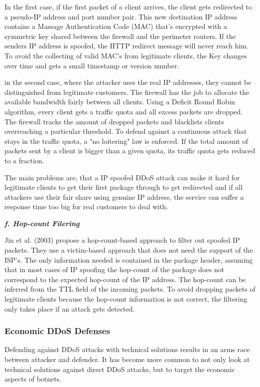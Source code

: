 In the first case, if the first packet of a client arrives, the client gets redirected to a pseudo-IP address and port number pair.
This new destination IP address contains a Massage Authentication Code (MAC) that's encrypted with a symmetric key shared between the firewall and the perimeter routers.
If the senders IP address is spoofed, the HTTP redirect message will never reach him.
To avoid the collecting of valid MAC's from legitimate clients, the Key changes over time and gets a small timestamp or version number.\cite{Xu03}

in the second case, where the attacker uses the real IP addresses, they cannot be distinguished from legitimate customers.
The firewall has the job to allocate the available bandwidth fairly between all clients.
Using a Deficit Round Robin algorithm, every client gets a traffic quota and all excess packets are dropped.
The firewall tracks the amount of dropped packets and blacklists clients overreaching a particular threshold.
To defend against a continuous attack that stays in the traffic quota, a "no loitering" law is enforced.
If the total amount of packets sent by a client is bigger than a given quota, its traffic quota gets reduced to a fraction.\cite{Xu03}

The main problems are, that a IP spoofed DDoS attack can make it hard for legitimate clients to get their first package through to get redirected and if all attackers use their fair share using genuine IP address, the service can suffer a response time too big for real customers to deal with.\cite{Xu03}

\textbf{\textit{f. Hop-count Filering}}

Jin et al. (2003) propose a hop-count-based approach to filter out spoofed IP packets.
They use a victim-based approach that does not need the support of the ISP's.
The only information needed is contained in the package header, assuming that in most cases of IP spoofing the hop-count of the package does not correspond to the expected hop-count of the IP address.
The hop-count can be inferred from the TTL field of the incoming packets.
To avoid dropping packets of legitimate clients because the hop-count information is not correct, the filtering only takes place if an attack gets detected.\cite{Jin03}

\subsubsection{Economic DDoS Defenses}
Defending against DDoS attacks with technical solutions results in an arms race between attacker and defender.
It has become more common to not only look at technical solutions against direct DDoS attacks, but to target the economic aspects of botnets.

